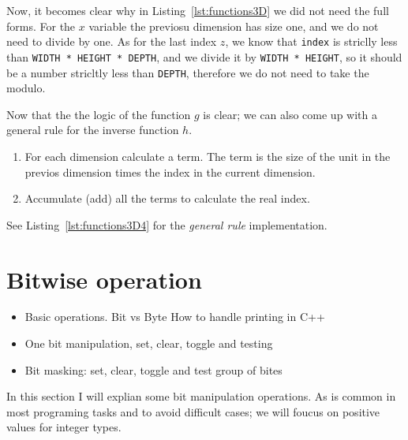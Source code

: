 Now, it becomes clear why in Listing~\ref{lst:functions3D} we did not need the full forms.
For the $x$ variable the previosu dimension has size one, and we do not need to divide by one.
As for the last index $z$, we know that \texttt{index} is striclly less than \texttt{WIDTH * HEIGHT * DEPTH}, and we divide it by \texttt{WIDTH * HEIGHT}, so it should be a number stricltly less than \texttt{DEPTH}, therefore we do not need to take the modulo.

Now that the the logic of the function $g$ is clear; we can also come up with a general rule for the inverse function $h$.

\begin{enumerate}
  \item For each dimension calculate a term. The term is the size of the unit in the previos dimension times the index in the current dimension.
  \item Accumulate (add) all the terms to calculate the real index.
\end{enumerate}

See Listing~\ref{lst:functions3D4} for the \emph{general rule} implementation.

{\centering
\begin{minipage}{\linewidth}
\end{minipage}
\par
}

\section{Bitwise operation}
\begin{itemize}
  \item Basic operations. Bit vs Byte How to handle printing in C++
  \item One bit manipulation, set, clear, toggle and testing
  \item Bit masking: set, clear, toggle and test group of bites
\end{itemize}
In this section I will explian some bit manipulation operations. As is common in most programing tasks and to avoid difficult cases; we will foucus on positive values for integer types.

